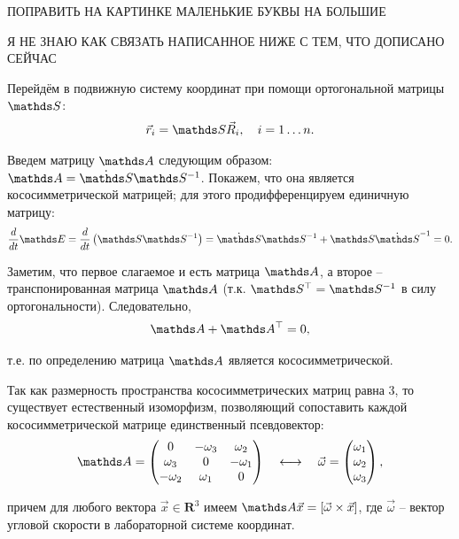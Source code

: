 ПОПРАВИТЬ НА КАРТИНКЕ МАЛЕНЬКИЕ БУКВЫ НА БОЛЬШИЕ

Я НЕ ЗНАЮ КАК СВЯЗАТЬ НАПИСАННОЕ НИЖЕ С ТЕМ, ЧТО ДОПИСАНО СЕЙЧАС

Перейдём в подвижную систему координат при помощи ортогональной матрицы $\bbS$:
\vspace*{-0.1cm}
\begin{gather}
\vec{r}_i = \bbS \vec{R}_i, \quad i = 1 \dots n. \notag
\end{gather}

Введем матрицу $\bbA$ следующим образом: $\bbA = \dot{\bbS} \bbS^{-1}$. Покажем, что она является кососимметрической матрицей; для этого продифференцируем единичную матрицу:
\vspace*{-0.1cm}
\begin{gather}
\frac{d}{dt} \bbE = \frac{d}{dt} \left( \bbS \bbS^{-1}\right) = \dot{\bbS} \bbS^{-1} + \bbS \dot{\bbS}^{-1} = 0. \notag
\end{gather}

Заметим, что первое слагаемое и есть матрица $\bbA$, а второе -- транспонированная матрица $\bbA$ (т.к. $\bbS^\top = \bbS^{-1}$ в силу ортогональности). Следовательно,
\vspace*{-0.1cm}
\begin{gather}
\bbA + \bbA^\top = 0, \notag
\end{gather}

\hspace*{-0.75cm} т.е. по определению матрица $\bbA$ является кососимметрической.

Так как размерность пространства кососимметрических матриц равна 3, то существует естественный изоморфизм, позволяющий сопоставить каждой кососимметрической матрице единственный псевдовектор:
\vspace*{-0.1cm}
\begin{gather}
\bbA = 
\begin{pmatrix}
0 & -\omega_3 & \omega_2 \\
\omega_3 & 0 & -\omega_1 \\
-\omega_2 & \omega_1 & 0
\end{pmatrix}
\quad
\longleftrightarrow
\quad
\vec{\omega} = 
\begin{pmatrix}
\omega_1 \\
\omega_2 \\
\omega_3
\end{pmatrix}
,
\notag
\end{gather}

\hspace*{-0.75cm} причем для любого вектора $\vec{x} \in \mathbf{R}^3$ имеем $\bbA \vec{x} = [ \vec{\omega} \times \vec{x} ]$, где $\vec{\omega}$ -- вектор угловой скорости в лабораторной системе координат.

